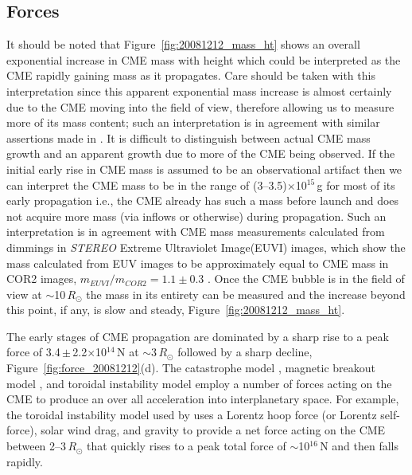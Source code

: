 
\subsection{Forces}\label{sec:21}

It should be noted that Figure~\ref{fig:20081212_mass_ht} shows an overall exponential increase in CME mass with height which could be interpreted as the CME rapidly gaining mass as it propagates. Care should be taken with this interpretation since this apparent exponential mass increase is almost certainly due to the CME moving into the field of view, therefore allowing us to measure more of its mass content; such an interpretation is in agreement with similar assertions made in \citet{vour2010}. It is difficult to distinguish between actual CME mass growth and an apparent growth due to more of the CME being observed. If the initial early rise in CME mass is assumed to be an observational artifact then we can interpret the CME mass to be in the range of (3--3.5)$\times$10$^{15}$\,g for most of its early propagation i.e., the CME already has such a mass before launch and does not acquire more mass (via inflows or otherwise) during propagation.
Such an interpretation is in agreement with CME mass measurements calculated from dimmings in \emph{STEREO} Extreme Ultraviolet Image(EUVI) images, which show the mass calculated from EUV images to be approximately equal to CME mass in COR2 images,  $m_{EUVI}/m_{COR2} =1.1\pm0.3$  \citep{aschw09}. Once the CME bubble is in the field of view at $\sim$10\,$R_{\odot}$ the mass in its entirety can be measured and the increase beyond this point, if any, is slow and steady, Figure~\ref{fig:20081212_mass_ht}.

The early stages of CME propagation are dominated by a sharp rise to a peak force of 3.4\,$\pm$\,2.2$\times$10$^{14}$\,N at $\sim$3\,$R_{\odot}$ followed by a sharp decline, Figure~\ref{fig:force_20081212}(d). The catastrophe model \citep{forbes1991,forbes1995,lin2000}, magnetic breakout model \citep{antio99,lynch2008}, and toroidal instability model \citep{chen1996,kleim2006} employ a number of forces acting on the CME to produce an over all acceleration into interplanetary space. For example, the toroidal instability model used by \citet{chen1996} uses a Lorentz hoop force (or Lorentz self-force), solar wind drag, and gravity to provide a net force acting on the CME between 2--3\,$R_{\odot}$ that quickly 
rises to a peak total force of $\sim$10$^{16}$\,N and then falls rapidly.

